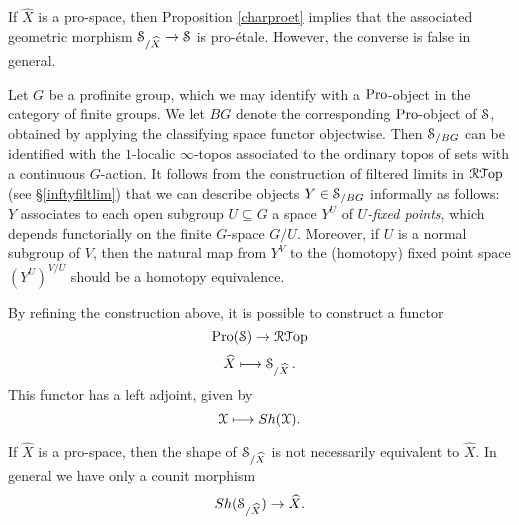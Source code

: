 \begin{remark}
If $\hat{X}$ is a pro-space, then Proposition \ref{charproet} implies that
the associated geometric morphism $\operatorname{\mathcal{S}}_{/ \widehat{X} } \rightarrow \operatorname{\mathcal{S}}$ is pro-\'{e}tale. However, the converse is false in general.
\end{remark}

\begin{remark}
Let $G$ be a profinite group, which we may identify with a $\operatorname{Pro}$-object in the category of finite groups. We let $BG$ denote the corresponding $\operatorname{Pro}$-object of $\operatorname{\mathcal{S}}$, obtained by applying the classifying space functor objectwise. Then $\operatorname{\mathcal{S}}_{/ BG}$ can be identified with
the $1$-localic $\infty$-topos associated to the ordinary topos of sets with a continuous $G$-action.
It follows from the construction of filtered limits in $\operatorname{\mathcal{R}{\mathcal T}op}$ (see \S \ref{inftyfiltlim}) that
we can describe objects $Y \in \operatorname{\mathcal{S}}_{/BG}$ informally as follows: $Y$ associates to
each open subgroup $U \subseteq G$ a space $Y^{U}$ of {\it $U$-fixed points}, which depends functorially on the finite $G$-space $G/U$. Moreover, if $U$ is a normal subgroup of $V$, then
the natural map from $Y^{V}$ to the (homotopy) fixed point space $(Y^{U})^{V/U}$ should be a homotopy equivalence.
\end{remark}

\begin{remark}
By refining the construction above, it is possible to construct a functor
$$ \operatorname{Pro}(\operatorname{\mathcal{S}}) \rightarrow \operatorname{\mathcal{R}{\mathcal T}op}$$
$$ \widehat{X} \longmapsto \operatorname{\mathcal{S}}_{/ \widehat{X} }.$$
This functor has a left adjoint, given by
$$ \operatorname{\mathcal{X}} \longmapsto Sh( \operatorname{\mathcal{X}} ).$$
\end{remark}

\begin{warning}
If $\hat{X}$ is a pro-space, then the shape of $\operatorname{\mathcal{S}}_{/\widehat{X}}$ is not necessarily equivalent to $\hat{X}$. In general we have only a counit morphism
$$ Sh ( \operatorname{\mathcal{S}}_{/ \widehat{X} } ) \rightarrow \widehat{X}.$$
\end{warning}
